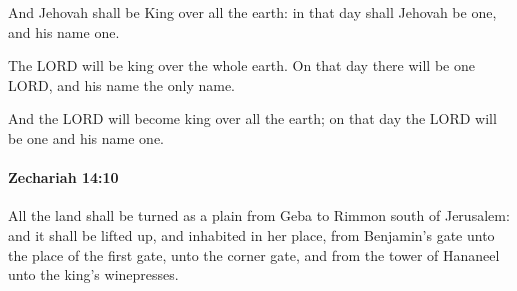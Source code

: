 			\begin{versebox}
					\item[BHS] 
					\item[LXX] 
					\item[ASV] And Jehovah shall be King over all the earth: in that day shall Jehovah be one, and his name one.
					\item[NIV] The LORD will be king over the whole earth. On that day there will be one LORD, and his name the only name.
					\item[NRSV] And the LORD will become king over all the earth; on that day the LORD will be one and his name one.
			\end{versebox}

		\paragraph{Zechariah 14:10} %
			\label{ZECHARIAH-14-10}

			All the land shall be turned as a plain from Geba to Rimmon south of Jerusalem: and it shall be lifted up, and inhabited in her place, from Benjamin’s gate unto the place of the first gate, unto the corner gate, and from the tower of Hananeel unto the king’s winepresses.


